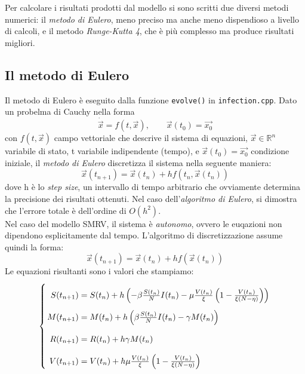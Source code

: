 \documentclass{article}
\begin{document}
\hspace{\parindent} Per calcolare i risultati prodotti dal modello 
si sono scritti due diversi metodi numerici: il \textit{metodo di Eulero},
meno preciso ma anche meno dispendioso a livello di calcoli, e il 
metodo \textit{Runge-Kutta 4}, che è più complesso ma produce 
risultati migliori.

\subsection{Il metodo di Eulero}
Il metodo di Eulero è eseguito dalla funzione \verb|evolve()| in 
\verb|infection.cpp|. Dato un probelma di Cauchy nella forma
\begin{equation} \label{eq::ODE} 
    \dot{\vec{x}} = f(t, \vec{x}), \qquad \vec{x}(t_0) = \vec{x_0}
\end{equation}
con $f(t, \vec{x})$ campo vettoriale che descrive il sistema di 
equazioni, $\vec{x} \in \mathbb{R}^n$ variabile di stato, 
t variabile indipendente (tempo), e $\vec{x}(t_0) = \vec{x_0}$
condizione iniziale, il \textit{metodo di Eulero} discretizza il 
sistema nella seguente maniera:
\begin{equation} \label{eq::Euler}
    \vec{x}(t_{n+1})=\vec{x}(t_n) + h f(t_n, \vec{x}(t_n))
\end{equation}
dove h è lo \textit{step size}, un intervallo di tempo arbitrario che 
ovviamente determina la precisione dei risultati ottenuti. 
Nel caso dell'\textit{algoritmo di Eulero}, si dimostra che l'errore 
totale è dell'ordine di $O(h^2)$. \\
Nel caso del modello SMRV, il sistema è \textit{autonomo}, ovvero le 
euqazioni non dipendono esplicitamente dal tempo. L'algoritmo di 
discretizzazione assume quindi la forma: 
\begin{equation} \label{eq::autoEuler}
    \vec{x}(t_{n+1})=\vec{x}(t_n) + h f(\vec{x}(t_n))
\end{equation}
Le equazioni risultanti sono i valori che stampiamo:
\begin{equation}\label{eq::evolve}
    \left\{ \arraycolsep=1.4pt\def\arraystretch{2.2}
    \begin{array}{rcl}
    S(t_{n+1}) & = & S(t_n) + h \left(-\beta \frac{S(t_n)}{N} I(t_n)
            - \mu \frac{V(t_n)}{\xi} \left(
            1 - \frac{V(t_n)}{\xi (N - \eta)} \right) \right) \\
    M(t_{n+1}) & = & M(t_n)+h\left(\beta \frac{S(t_n)}{N} I(t_n) 
            - \gamma M(t_n)\right) \\
    R(t_{n+1}) & = & R(t_n) + h \gamma M(t_n) \\
    V(t_{n+1}) & = & V(t_n) +h \mu \frac{V(t_n)}{\xi} \left(
            1 - \frac{V(t_n)}{\xi (N - \eta)} \right) \\
    \end{array}\right.
\end{equation}
\end{document}
